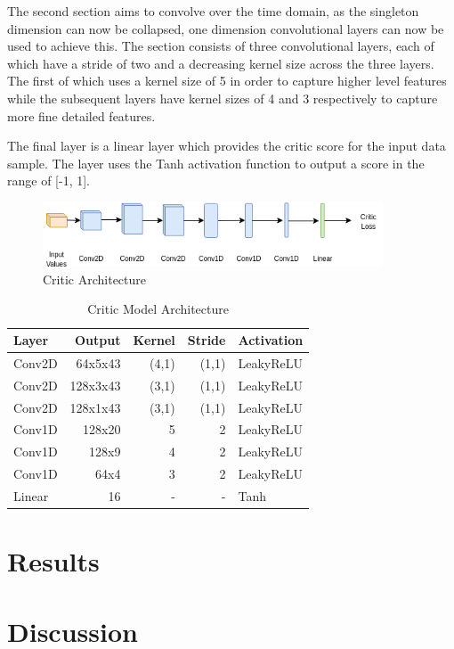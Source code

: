 The second section aims to convolve over the time domain, as the singleton dimension can now be collapsed, one dimension convolutional layers can now be used to achieve this.
The section consists of three convolutional layers, each of which have a stride of two and a decreasing kernel size across the three layers.
The first of which uses a kernel size of 5 in order to capture higher level features while the subsequent layers have kernel sizes of 4 and 3 respectively to capture more fine detailed features.

The final layer is a linear layer which provides the critic score for the input data sample.
The layer uses the Tanh activation function to output a score in the range of [-1, 1].

\begin{figure}[h!]
    \centering
        \includegraphics[width=0.9\textwidth]{figures/gan/critic.png}
    \caption{Critic Architecture}\label{fig:gan_critic_arch}
\end{figure}
\quad

\begin{table}[h!]
\centering
    \begin{tabular}{ l | r | r | r | l}
    \textbf{Layer} & \textbf{Output} & \textbf{Kernel} & \textbf{Stride} & \textbf{Activation} \\ \hline
    Conv2D & 64x5x43   & (4,1) & (1,1) & LeakyReLU \\ \hline
    Conv2D & 128x3x43  & (3,1) & (1,1) & LeakyReLU \\ \hline
    Conv2D & 128x1x43  & (3,1) & (1,1) & LeakyReLU \\ \hline
    Conv1D & 128x20    & 5     & 2     & LeakyReLU \\ \hline
    Conv1D & 128x9     & 4     & 2     & LeakyReLU \\ \hline
    Conv1D & 64x4      & 3     & 2     & LeakyReLU \\ \hline
    Linear & 16        & -     & -     & Tanh      
    \end{tabular} 
    \caption{Critic Model Architecture}\label{table:gan_critic_arch}
\end{table}
\quad


\section{Results}

\section{Discussion}
